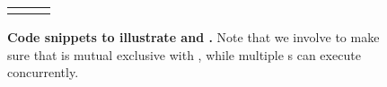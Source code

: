 \begin{figure}
\centering
  \begin{tabular}{T{.4\textwidth} T{0.02\textwidth} T{.55\textwidth} }
   & &
  \end{tabular}
  \caption{{\bf Code snippets to illustrate  and
  .} Note that we involve  to make sure that
   is mutual exclusive with , while multiple
  s can execute concurrently.}
  \label{fig:pushsteal}
\end{figure}
